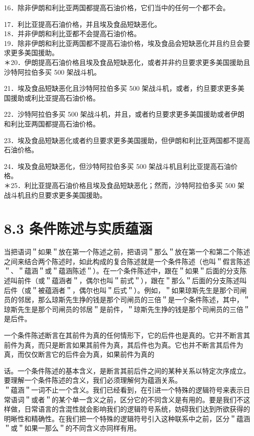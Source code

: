 16．除非伊朗和利比亚两国都提高石油价格，它们当中的任何一个都不会。

17．利比亚提高石油价格，并且埃及食品短缺恶化。\\
18．并非伊朗和利比亚都不会提高石油价格。\\
19．除非伊朗和利比亚两国都不提高石油价格，埃及食品会短缺恶化并且约旦会要求更多美国援助。\\
＊20．伊朗提高石油价格且埃及食品短缺恶化，或者并非约旦要求更多美国援助且沙特阿拉伯多买 500 架战斗机。

21．埃及食品短缺恶化且沙特阿拉伯多买 500 架战斗机，或者，约旦要求更多美国援助或利比亚提高石油价格。

22．沙特阿拉伯多买 500 架战斗机，并且，或者约旦要求更多美国援助或者伊朗和利比亚两国都提高石油价格。

23．埃及食品短缺恶化或者约旦要求更多美国援助，但伊朗和利比亚两国都不提高石油价格。

24．埃及食品短缺恶化，但沙特阿拉伯多买 500 架战斗机且利比亚提高石油价格。\\
＊25．利比亚提高石油价格且埃及食品短缺恶化；然而，沙特阿拉伯多买 500 架战斗机且约旦要求更多美国援助。

\section*{8.3 条件陈述与实质蕴涵}
当把语词＂如果＂放在第一个陈述之前，把语词＂那么＂放在第一个和第二个陈述之间来结合两个陈述时，如此构成的复合陈述就是一个条件陈述（也叫＂假言陈述＂、＂蕴涵＂或＂蕴涵陈述＂）。在一个条件陈述中，跟在＂如果＂后面的分支陈述叫前件（或＂蕴涵者＂，偶尔也叫＂前式＂），跟在＂那么＂后面的分支陈述叫后件（或＂被蕴涵者＂，偶尔也叫＂后式＂）。例如，＂如果琼斯先生是那个司闸员的邻居，那么琼斯先生挣的钱是那个司闸员的三倍＂是一个条件陈述，其中，＂琼斯先生是那个司闸员的邻居＂是前件，＂琼斯先生挣的钱是那个司闸员的三倍＂是后件。

一个条件陈述断言在其前件为真的任何情形下，它的后件也是真的。它并不断言其前件为真，而只是断言如果其前件为真，其后件也为真。它也并不断言其后件为真，而仅仅断言它的后件会为真，如果前件为真的

话。一个条件陈述的基本含义，是断言其前后件之间的某种关系以特定次序成立。要理解一个条件陈述的含义，我们必须理解何为蕴涵关系。\\
＂蕴涵＂一词不止一个含义。我们已经看到，在引进一个特殊的逻辑符号来表示日常语词＂或者＂的某个单一含义之前，区分它的不同含义是有用的。要是我们不这样做，日常语言的含混性就会影响我们的逻辑符号系统，妨碍我们达到所欲获得的明晰性和精确性。在我们把一个特殊的逻辑符号引入这种联系中之前，区分＂蕴涵＂或＂如果一那么＂的不同含义亦同样有用。

